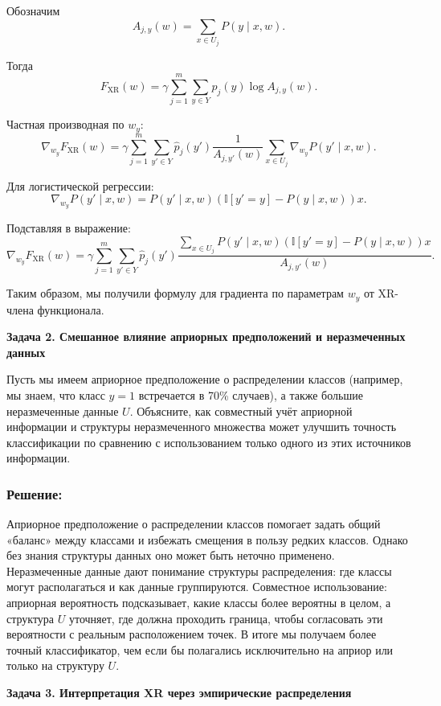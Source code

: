 Обозначим
\[
A_{j,y}(w) = \sum_{x \in U_j} P(y \mid x,w).
\]

Тогда
\[
F_{\text{XR}}(w) = \gamma \sum_{j=1}^m \sum_{y \in Y} \hat{p}_j(y) \log A_{j,y}(w).
\]

Частная производная по $w_y$:
\[
\nabla_{w_y} F_{\text{XR}}(w) = \gamma \sum_{j=1}^m \sum_{y' \in Y} \hat{p}_j(y') \frac{1}{A_{j,y'}(w)} \sum_{x \in U_j} \nabla_{w_y}P(y' \mid x,w).
\]

Для логистической регрессии:
\[
\nabla_{w_y}P(y' \mid x,w) = P(y' \mid x,w)(\mathbb{I}[y'=y]-P(y \mid x,w))x.
\]

Подставляя в выражение:
\[
\nabla_{w_y} F_{\text{XR}}(w) = \gamma \sum_{j=1}^m \sum_{y' \in Y} \hat{p}_j(y') \frac{\sum_{x \in U_j} P(y' \mid x,w)(\mathbb{I}[y'=y]-P(y \mid x,w))x}{A_{j,y'}(w)}.
\]

Таким образом, мы получили формулу для градиента по параметрам $w_y$ от XR-члена функционала.

\bigskip

\noindent\textbf{Задача 2. Смешанное влияние априорных предположений и неразмеченных данных}

Пусть мы имеем априорное предположение о распределении классов (например, мы знаем, что класс $y=1$ встречается в 70\% случаев), а также большие неразмеченные данные $U$. Объясните, как совместный учёт априорной информации и структуры неразмеченного множества может улучшить точность классификации по сравнению с использованием только одного из этих источников информации.

\subsubsection*{Решение:}
Априорное предположение о распределении классов помогает задать общий «баланс» между классами и избежать смещения в пользу редких классов. Однако без знания структуры данных оно может быть неточно применено. Неразмеченные данные дают понимание структуры распределения: где классы могут располагаться и как данные группируются. Совместное использование: априорная вероятность подсказывает, какие классы более вероятны в целом, а структура $U$ уточняет, где должна проходить граница, чтобы согласовать эти вероятности с реальным расположением точек. В итоге мы получаем более точный классификатор, чем если бы полагались исключительно на априор или только на структуру $U$.

\bigskip

\noindent\textbf{Задача 3. Интерпретация XR через эмпирические распределения}

